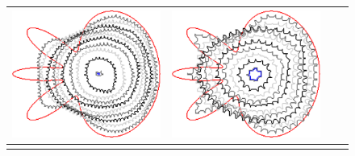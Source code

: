 \begin{figure}
\begin{tabular}{p{2.5em}ccc}
\includegraphics[scale=0.23]{figures/chapter6/radius-effect/flower/improve/len_pen0/radius-5/summary.pdf} &
\includegraphics[scale=0.23]{figures/chapter6/radius-effect/flower/improve/len_pen0/radius-9/summary.pdf} \\
\hline \\

\end{tabular}
\end{figure}
